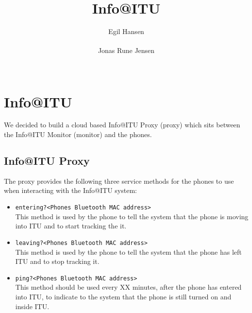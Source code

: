 \documentclass{ubicomp2011}
\begin{document}
\setlength{\paperheight}{11in}
\setlength{\paperwidth}{8.5in}
\setlength{\pdfpageheight}{\paperheight}
\setlength{\pdfpagewidth}{\paperwidth}

\toappear{}



\title{Info@ITU}
\author{
  \alignauthor Egil Hansen\\
    \\
 \alignauthor Jonas Rune Jensen\\
    \\
    }
    
\maketitle


\section{Info@ITU}
We decided to build a cloud based Info@ITU Proxy (proxy) which sits between the Info@ITU Monitor (monitor) and the phones.

\subsection{Info@ITU Proxy}
The proxy provides the following three service methods for the phones to use when interacting with the Info@ITU system:

\begin{itemize}
\item \texttt{entering?<Phones Bluetooth MAC address>}\\
This method is used by the phone to tell the system that the phone is moving into ITU and to start tracking the it.
\item \texttt{leaving?<Phones Bluetooth MAC address>}\\
This method is used by the phone to tell the system that the phone has left ITU and to stop tracking it.
\item \texttt{ping?<Phones Bluetooth MAC address>}\\
This method should be used every XX minutes, after the phone has entered into ITU, to indicate to the system that the phone is still turned on and inside ITU.
\end{itemize}
\end{document}
